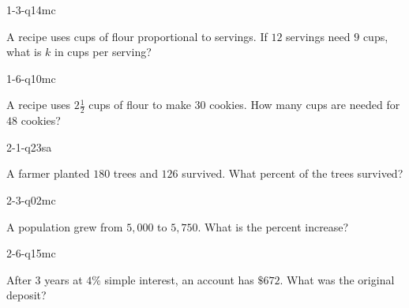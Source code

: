 
\begin{practiceQuestion}{1-3-q14}{mc}
\begin{questionText}
A recipe uses cups of flour proportional to servings. If $12$ servings need $9$ cups, what is $k$ in cups per serving?
\end{questionText}
\end{practiceQuestion}

\begin{practiceQuestion}{1-6-q10}{mc}
\begin{questionText}
A recipe uses $2\frac{1}{2}$ cups of flour to make $30$ cookies. How many cups are needed for $48$ cookies?
\end{questionText}
\end{practiceQuestion}

\begin{practiceQuestion}{2-1-q23}{sa}
\begin{questionText}
A farmer planted $180$ trees and $126$ survived. What percent of the trees survived?
\end{questionText}
\end{practiceQuestion}

\begin{practiceQuestion}{2-3-q02}{mc}
\begin{questionText}
A population grew from $5{,}000$ to $5{,}750$. What is the percent increase?
\end{questionText}
\end{practiceQuestion}

\begin{practiceQuestion}{2-6-q15}{mc}
\begin{questionText}
After $3$ years at $4\%$ simple interest, an account has $\$672$. What was the original deposit?
\end{questionText}
\end{practiceQuestion}

